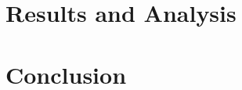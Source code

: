 \documentclass{article} %
\begin{document}
\section{Results and Analysis}
\label{sec:analysis}


\section{Conclusion}


% 

{\small
{}

}


\newpage

\end{document}
